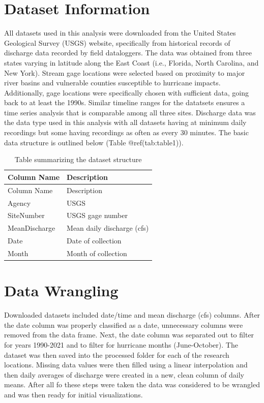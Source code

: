 \documentclass[
  12pt,
]{article}
\begin{document}
\newpage

\hypertarget{dataset-information}{%
\section{Dataset Information}\label{dataset-information}}

All datasets used in this analysis were downloaded from the United
States Geological Survey (USGS) website, specifically from historical
records of discharge data recorded by field dataloggers. The data was
obtained from three states varying in latitude along the East Coast
(i.e., Florida, North Carolina, and New York). Stream gage locations
were selected based on proximity to major river basins and vulnerable
counties susceptible to hurricane impacts. Additionally, gage locations
were specifically chosen with sufficient data, going back to at least
the 1990s. Similar timeline ranges for the datatsets ensures a time
series analysis that is comparable among all three sites. Discharge data
was the data type used in this analysis with all datasets having at
minimum daily recordings but some having recordings as often as every 30
minutes. The basic data structure is outlined below (Table
@ref(tab:table1)).

\begin{longtable}[]{@{}ll@{}}
\caption{Table summarizing the dataset structure}\tabularnewline
\toprule
Column Name & Description \\
\midrule
\endfirsthead
\toprule
Column Name & Description \\
\midrule
\endhead
Agency & USGS \\
SiteNumber & USGS gage number \\
MeanDischarge & Mean daily discharge (cfs) \\
Date & Date of collection \\
Month & Month of collection \\
\bottomrule
\end{longtable}

\newpage

\hypertarget{data-wrangling}{%
\section{Data Wrangling}\label{data-wrangling}}

Downloaded datasets included date/time and mean discharge (cfs) columns.
After the date column was properly classified as a date, unnecessary
columns were removed from the data frame. Next, the date column was
separated out to filter for years 1990-2021 and to filter for hurricane
months (June-October). The dataset was then saved into the processed
folder for each of the research locations. Missing data values were then
filled using a linear interpolation and then daily averages of discharge
were created in a new, clean column of daily means. After all fo these
steps were taken the data was considered to be wrangled and was then
ready for initial visualizations.
\end{document}
